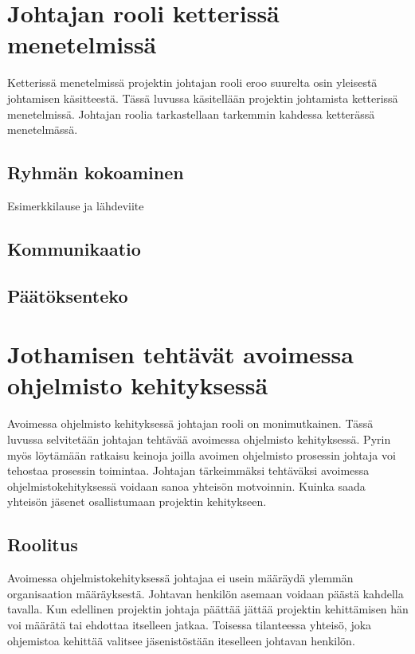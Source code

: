 \documentclass[finnish]{tktltiki2}
\theoremstyle{definition}
\theoremstyle{remark}
\begin{document}
\section{Johtajan rooli ketterissä menetelmissä}

Ketterissä menetelmissä projektin johtajan rooli eroo suurelta osin yleisestä johtamisen käsitteestä. Tässä luvussa käsitellään projektin johtamista ketterissä menetelmissä. Johtajan roolia tarkastellaan tarkemmin kahdessa ketterässä menetelmässä. 

\subsection{Ryhmän  kokoaminen}
Esimerkkilause ja lähdeviite~\cite{4755768}

\subsection{Kommunikaatio}

\subsection{Päätöksenteko}

\section{Jothamisen tehtävät avoimessa ohjelmisto kehityksessä}

Avoimessa ohjelmisto kehityksessä johtajan rooli on monimutkainen. Tässä luvussa selvitetään johtajan tehtävää avoimessa ohjelmisto kehityksessä. Pyrin myös löytämään ratkaisu keinoja joilla avoimen ohjelmisto prosessin johtaja voi tehostaa prosessin toimintaa. Johtajan tärkeimmäksi tehtäväksi avoimessa ohjelmistokehityksessä  voidaan sanoa yhteisön motvoinnin. Kuinka saada yhteisön jäsenet osallistumaan projektin kehitykseen.~\cite{Li:2006:MOS:1125170.1125182}

\subsection{Roolitus}

Avoimessa ohjelmistokehityksessä johtajaa ei usein määräydä ylemmän organisaation määräyksestä. Johtavan henkilön asemaan voidaan päästä kahdella tavalla. Kun edellinen projektin johtaja päättää jättää projektin kehittämisen hän voi määrätä tai ehdottaa itselleen jatkaa. Toisessa tilanteessa yhteisö, joka ohjemistoa kehittää valitsee jäsenistöstään iteselleen johtavan henkilön. ~\cite{Li:2006:MOS:1125170.1125182}
\end{document}
